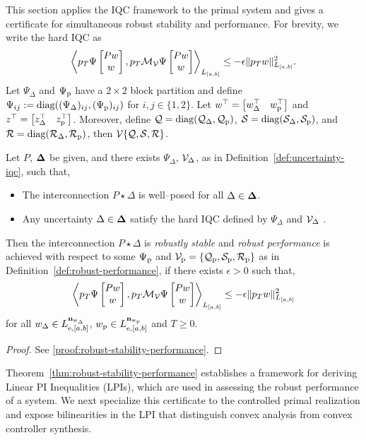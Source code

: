 This section applies the IQC framework to the primal system and gives a
certificate for simultaneous robust stability and performance. For brevity,
we write the hard IQC as
\begin{equation*}
    \left\langle p_T \Psi\begin{bmatrix}Pw \\ w\end{bmatrix}, p_T \mathcal{M}_{\mathcal{V}}\Psi\begin{bmatrix}Pw \\ w\end{bmatrix} \right\rangle_{L_{[a,b]}} \leq -\epsilon \|p_T w\|^2_{L_{[a,b]}}.
\end{equation*}
Let $\Psi_\Delta$ and $\Psi_{{\mathrm{p}}}$ have a $2\times2$ block partition and define
$\Psi_{ij}:=\operatorname{diag}((\Psi_\Delta)_{ij},(\Psi_{{\mathrm{p}}})_{ij})$ for
$i,j\in\{1,2\}$. Let $w^\top=\begin{bmatrix}w_\Delta^\top & w_{{\mathrm{p}}}^\top\end{bmatrix}$ and $z^\top=\begin{bmatrix}z_\Delta^\top & z_{{\mathrm{p}}}^\top\end{bmatrix}$.
Moreover, define $\mathcal{Q} = \operatorname{diag}(\mathcal{Q}_\Delta, \mathcal{Q}_{{\mathrm{p}}})$,
$\mathcal{S} = \operatorname{diag}(\mathcal{S}_\Delta, \mathcal{S}_{{\mathrm{p}}})$, and
$\mathcal{R} = \operatorname{diag}(\mathcal{R}_\Delta, \mathcal{R}_{{\mathrm{p}}})$, then
$\mathcal{V}\{\mathcal{Q}, \mathcal{S}, \mathcal{R}\}$.

\begin{theorem}\label{thm:robust-stability-performance}
Let $P$, $\mathbf{\Delta}$ be given, and there exists $\Psi_\Delta$,
${\mathcal{V}_\Delta}$, as in Definition~\ref{def:uncertainty-iqc}, such that,
\begin{itemize}
\item The interconnection $P\star\Delta$ is well--posed for all
$\Delta\in\mathbf{\Delta}$.
\item Any uncertainty
$\Delta\in\mathbf{\Delta}$ satisfy the hard IQC defined by $\Psi_\Delta$ and $\mathcal{V}_\Delta$ .
\end{itemize}
Then the interconnection $P \star \Delta$ is \emph{robustly stable} and
\emph{robust performance} is achieved with respect to some $\Psi_{{\mathrm{p}}}$ and
${{\mathcal{V}}_{{\mathrm{p}}}} =\{\mathcal{Q}_{{\mathrm{p}}}, \mathcal{S}_{{\mathrm{p}}}, \mathcal{R}_{{\mathrm{p}}}\}$
as in Definition~\ref{def:robust-performance}, if there exists $\epsilon>0$ such that,
\begin{equation}\label{eq:robust-condition}
\left\langle p_T\Psi\begin{bmatrix}Pw \\ w\end{bmatrix}, p_T\mathcal{M}_{\mathcal{V}}\Psi\begin{bmatrix}Pw \\ w\end{bmatrix} \right\rangle_{L_{[a,b]}} 
\leq
-\epsilon
\|p_Tw\|^2_{L_{[a,b]}}
\end{equation}
for all $w_\Delta \in L_{{\mathrm{e}},[a,b]}^{\mathbf{n}_{{\mathrm{w}}_\Delta}}$,
$w_{{\mathrm{p}}} \in L_{{\mathrm{e}},[a,b]}^{\mathbf{n}_{{\mathrm{w}}_{{\mathrm{p}}}}}$ and $T \geq 0$.
\end{theorem}
\begin{proof}
See \ref{proof:robust-stability-performance}.
\end{proof}
Theorem~\ref{thm:robust-stability-performance} establishes a framework for deriving Linear PI
Inequalities (LPIs), which are used in assessing the robust performance of a
system. We next specialize this certificate to the controlled primal
realization and expose bilinearities in the LPI that distinguish convex analysis from
convex controller synthesis.
\primalsystemcomponents
